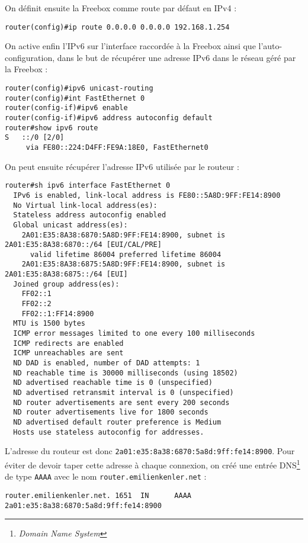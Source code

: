 On définit ensuite la Freebox comme route par défaut en IPv4 :
\begin{lstlisting}
router(config)#ip route 0.0.0.0 0.0.0.0 192.168.1.254
\end{lstlisting}

On active enfin l’IPv6 sur l’interface raccordée à la Freebox ainsi que l’auto-configuration, dans le but de récupérer une adresse IPv6 dans le réseau géré par la Freebox :

\begin{lstlisting}
router(config)#ipv6 unicast-routing 
router(config)#int FastEthernet 0
router(config-if)#ipv6 enable
router(config-if)#ipv6 address autoconfig default
router#show ipv6 route
S   ::/0 [2/0]
     via FE80::224:D4FF:FE9A:18E0, FastEthernet0
\end{lstlisting}

On peut ensuite récupérer l'adresse IPv6 utilisée par le routeur :
\begin{lstlisting}
router#sh ipv6 interface FastEthernet 0
  IPv6 is enabled, link-local address is FE80::5A8D:9FF:FE14:8900 
  No Virtual link-local address(es):
  Stateless address autoconfig enabled
  Global unicast address(es):
    2A01:E35:8A38:6870:5A8D:9FF:FE14:8900, subnet is 2A01:E35:8A38:6870::/64 [EUI/CAL/PRE]
      valid lifetime 86004 preferred lifetime 86004
    2A01:E35:8A38:6875:5A8D:9FF:FE14:8900, subnet is 2A01:E35:8A38:6875::/64 [EUI]
  Joined group address(es):
    FF02::1
    FF02::2
    FF02::1:FF14:8900
  MTU is 1500 bytes
  ICMP error messages limited to one every 100 milliseconds
  ICMP redirects are enabled
  ICMP unreachables are sent
  ND DAD is enabled, number of DAD attempts: 1
  ND reachable time is 30000 milliseconds (using 18502)
  ND advertised reachable time is 0 (unspecified)
  ND advertised retransmit interval is 0 (unspecified)
  ND router advertisements are sent every 200 seconds
  ND router advertisements live for 1800 seconds
  ND advertised default router preference is Medium
  Hosts use stateless autoconfig for addresses.
\end{lstlisting}

L'adresse du routeur est donc \texttt{2a01:e35:8a38:6870:5a8d:9ff:fe14:8900}.
Pour éviter de devoir taper cette adresse à chaque connexion, on créé une entrée DNS\footnote{\emph{Domain Name System}} de type \texttt{AAAA} avec le nom \texttt{router.emilienkenler.net} :

\begin{lstlisting}
router.emilienkenler.net. 1651  IN      AAAA    2a01:e35:8a38:6870:5a8d:9ff:fe14:8900
\end{lstlisting}

